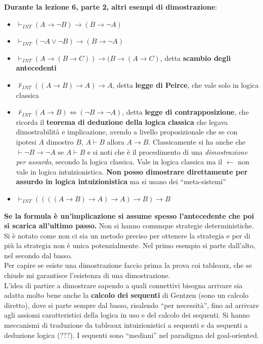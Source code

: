 \documentclass[a4paper,12pt, oneside]{book}
\begin{document}
\noindent
\textbf{Durante la lezione 6, parte 2, altri esempi di dimostrazione}:
\begin{itemize}
  \item $\vdash_{INT}(A\to\neg B)\to(B\to \neg A)$
  \item $\vdash_{INT}(\neg A\lor\neg B)\to(B\to \neg A)$
  \item $\vdash_{INT}(A\to(B\to C))\to(B\to(A\to C)$, detta \textbf{scambio
    degli antecedenti}  
  \item $\nvdash_{INT} ((A\to B)\to A)\to A$, detta \textbf{legge di Peirce},
  che vale solo in logica classica
  \item $\nvdash_{INT}(A\to B)\iff(\neg B\to \neg A)$, detta \textbf{legge di
    contrapposizione}, che ricorda il\textbf{ teorema di deduzione della logica
    classica} che legava dimostrabilità e implicazione, avendo a livello
  proposizionale che se con ipotesi $A$ dimostro $B$, $A\vdash B$ allora $A\to
  B$. Classicamente si ha anche che $\vdash \neg B\to \neg A$ se $A\vdash B$ e
  si noti che è il procedimento di una \textit{dimostrazione per assurdo},
  secondo la logica classica. Vale in logica classica ma il $\gets$ non vale in
  logica intuizionistica. \textbf{Non posso dimostrare direttamente per assurdo
    in logica intuizionistica} ma si usano dei ``meta-sistemi''
  \item $\vdash_{INT}((((A\to B)\to A)\to A)\to B)\to B$
\end{itemize}
\textbf{Se la formula è un'implicazione si assume spesso l'antecedente che poi
  si scarica all'ultimo passo.} Non si hanno comunque strategie
deterministiche.\\
Si è notato come non ci sia un metodo preciso per ottenere la strategia e per di
più la strategia non è unica potenzialmente. Nel primo esempio si parte
dall'alto, nel secondo dal basso.\\
Per capire se esiste una dimostrazione faccio prima la prova coi tableaux, che
se chiude mi garantisce l'esistenza di una dimostrazione.\\
L'idea di partire a dimostrare sapendo a quali connettivi bisogna arrivare sia
adatta molto bene anche la \textbf{calcolo dei sequenti} di Gentzen (sono un
calcolo diretto), dove si
parte sempre dal basso, risalendo ``per necessità'', fino ad arrivare agli
assiomi caratteristici della logica in uso e del calcolo dei sequenti. Si hanno
meccanismi di traduzione da tableaux intuizionistici a sequenti e da sequenti a
deduzione logica (???). I sequenti sono ``mediani'' nel paradigma del
goal-oriented. \\
\end{document}

